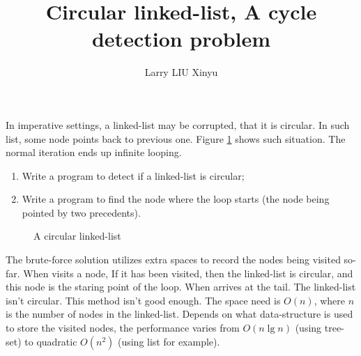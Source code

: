 \documentclass{article}
\begin{document}
\title{Circular linked-list, A cycle detection problem}
\author{Larry LIU Xinyu}
\maketitle

In imperative settings, a linked-list may be corrupted, that it is circular. In such list, some node
points back to previous one. Figure \ref{fig:circular-list} shows such situation.
The normal iteration ends up infinite looping.
  \begin{enumerate}
    \item Write a program to detect if a linked-list is circular;
    \item Write a program to find the node where the loop starts (the node being pointed by two precedents).
  \end{enumerate}

\begin{figure}[htdp]
\centering
{}
\caption{A circular linked-list}
\label{fig:circular-list}
\end{figure}

The brute-force solution utilizes extra spaces to record the nodes being visited so-far.
When visits a node, If it has been visited, then the linked-list is circular, and this
node is the staring point of the loop. When arrives at the tail. The linked-list isn't
circular. This method isn't good enough. The space need is $O(n)$, where $n$ is the
number of nodes in the linked-list. Depends on what data-structure is used to store
the visited nodes, the performance varies from $O(n \lg n)$ (using tree-set) to quadratic $O(n^2)$
(using list for example).
\end{document}
